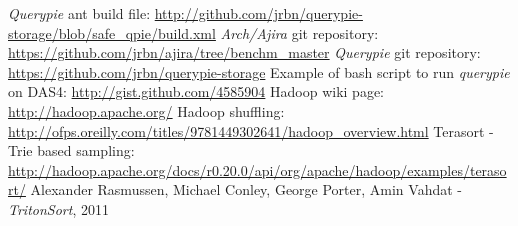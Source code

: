 \begin{thebibliography}{99}
		{\emph{Querypie} ant build file: \url{http://github.com/jrbn/querypie-storage/blob/safe_qpie/build.xml}}
		{\emph{Arch/Ajira} git repository: \url{https://github.com/jrbn/ajira/tree/benchm_master}}
		{\emph{Querypie} git repository: \url{https://github.com/jrbn/querypie-storage}}
		{Example of bash script to run \emph{querypie} on DAS4: \url{http://gist.github.com/4585904}}
		{Hadoop wiki page: \url{http://hadoop.apache.org/}}
		{Hadoop shuffling: \url{http://ofps.oreilly.com/titles/9781449302641/hadoop_overview.html}}
		{Terasort - Trie based sampling: \url{http://hadoop.apache.org/docs/r0.20.0/api/org/apache/hadoop/examples/terasort/}}
		{Alexander Rasmussen, Michael Conley, George Porter, Amin Vahdat - \textit{TritonSort}, 2011}
\end{thebibliography}
